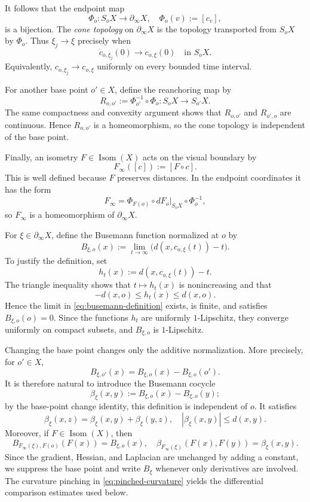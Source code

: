 \documentclass[12pt]{amsart}
\theoremstyle{definition}
\numberwithin{equation}{section}
\begin{document}
It follows that the endpoint map
\[
  \Phi_o\colon S_oX\longrightarrow\partial_\infty X,
  \quad
  \Phi_o(v):=[c_v],
\]
is a bijection.  The \emph{cone topology} on \(\partial_\infty X\) is the
topology transported from \(S_oX\) by \(\Phi_o\).  Thus
\(\xi_j\to\xi\) precisely when
\[
  \dot c_{o,\xi_j}(0)\longrightarrow\dot c_{o,\xi}(0)
  \quad\text{in }S_oX.
\]
Equivalently, \(c_{o,\xi_j}\to c_{o,\xi}\) uniformly on every bounded time
interval.

For another base point \(o'\in X\), define the reanchoring map by
\[
  R_{o,o'}
  :=
  \Phi_{o'}^{-1}\circ\Phi_o
  \colon S_oX\longrightarrow S_{o'}X.
\]
The same compactness and convexity argument shows that \(R_{o,o'}\) and
\(R_{o',o}\) are continuous.  Hence \(R_{o,o'}\) is a homeomorphism, so the
cone topology is independent of the base point.

Finally, an isometry \(F\in\operatorname{Isom}(X)\) acts on the visual
boundary by
\[
  F_\infty([c]):=[F\circ c].
\]
This is well defined because \(F\) preserves distances.  In the endpoint
coordinates it has the form
\[
  F_\infty
  =
  \Phi_{F(o)}
  \circ\left.dF_o\right|_{S_oX}
  \circ\Phi_o^{-1},
\]
so \(F_\infty\) is a homeomorphism of \(\partial_\infty X\).

For \(\xi\in\partial_\infty X\), define the Busemann function normalized at
\(o\) by
\begin{equation}\label{eq:busemann-definition}
  B_{\xi,o}(x)
  :=\lim_{t\to\infty}
  \bigl(d(x,c_{o,\xi}(t))-t\bigr).
\end{equation}
To justify the definition, set
\[
  h_t(x):=d(x,c_{o,\xi}(t))-t.
\]
The triangle inequality shows that \(t\mapsto h_t(x)\) is nonincreasing and
that
\[
  -d(x,o)\leq h_t(x)\leq d(x,o).
\]
Hence the limit in \eqref{eq:busemann-definition} exists, is finite, and
satisfies \(B_{\xi,o}(o)=0\).  Since the functions \(h_t\) are uniformly
\(1\)-Lipschitz, they converge uniformly on compact subsets, and
\(B_{\xi,o}\) is \(1\)-Lipschitz.

Changing the base point changes only the additive normalization.  More
precisely, for \(o'\in X\),
\[
  B_{\xi,o'}(x)
  =
  B_{\xi,o}(x)-B_{\xi,o}(o').
\]
It is therefore natural to introduce the Busemann cocycle
\[
  \beta_\xi(x,y)
  :=
  B_{\xi,o}(x)-B_{\xi,o}(y);
\]
by the base-point change identity, this definition is independent of \(o\).
It satisfies
\[
  \beta_\xi(x,z)
  =
  \beta_\xi(x,y)+\beta_\xi(y,z),
  \quad
  |\beta_\xi(x,y)|\leq d(x,y).
\]
Moreover, if \(F\in\operatorname{Isom}(X)\), then
\[
  B_{F_\infty(\xi),F(o)}(F(x))=B_{\xi,o}(x),
  \quad
  \beta_{F_\infty(\xi)}(F(x),F(y))=\beta_\xi(x,y).
\]
Since the gradient, Hessian, and Laplacian are unchanged by adding a
constant, we suppress the base point and write \(B_\xi\) whenever only
derivatives are involved.  The curvature pinching in
\eqref{eq:pinched-curvature} yields the differential comparison estimates
used below.
\end{document}
